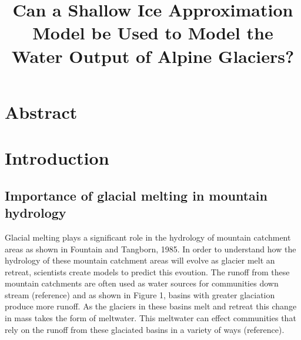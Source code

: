 \documentclass{article}
\title{Can a Shallow Ice Approximation Model be Used to Model the Water Output of Alpine Glaciers?}
\author{}
\date{}
\begin{document}
\maketitle

\section*{Abstract}

\section{Introduction}
\subsection{Importance of glacial melting in mountain hydrology}
Glacial melting plays a significant role in the hydrology of mountain catchment areas as shown in Fountain and Tangborn, 1985. In order to 
understand how the hydrology of these mountain catchment areas will evolve as glacier melt an retreat, scientists create models to predict 
this evoution. The runoff from these mountain catchments are often used as water sources for communities down stream (reference) and as shown in 
Figure 1, basins with greater glaciation produce more runoff. As the glaciers in these basins melt and retreat this change in mass takes the 
form of meltwater. This meltwater can effect communities that rely on the runoff from these glaciated basins in a variety of ways (reference).
\end{document}
